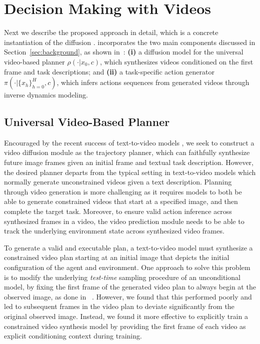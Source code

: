 \section{Decision Making with Videos}\label{sec:method}




Next we describe the proposed approach \model in detail, which is a concrete instantiation of the diffusion \proc. \model incorporates %
the two main components discussed in Section~\ref{sec:background}, %
as shown in~: {\bf (i)} a diffusion model for the universal video-based planner $\rho(\cdot|x_0, c)$, which synthesizes videos conditioned on the first frame and task descriptions; and {\bf (ii)} a task-specific action generator $\pi(\cdot|\{x_h\}_{h=0}^H, c)$, which infers actions sequences from generated videos through inverse dynamics modeling.



\subsection{Universal Video-Based Planner}

Encouraged by the recent success of text-to-video models \citep{ho2022imagen}, we seek to construct a video diffusion module as the trajectory planner, which can faithfully synthesize future image frames given an initial frame and textual task description. 
However, the desired planner departs from the typical setting in text-to-video models \citep{villegas2022phenaki, ho2022imagen} which normally generate unconstrained videos given a text description. Planning through video generation is more challenging as it requires models to both be able to generate constrained videos that start at a specified image, and then complete the target task. 
Moreover, to ensure valid action inference across synthesized frames in a video, the video prediction module needs to be able to track the underlying environment state across synthesized video frames. %

 To generate a valid and executable plan, a text-to-video model must synthesize a constrained video plan starting at an initial image that depicts the initial configuration of the agent and environment. %
One approach to solve this problem is to modify the underlying \emph{test-time} sampling procedure of an unconditional model, by fixing the first frame of the generated video plan to always begin at the observed image, as done in ~\citep{janner2022planning}. However, we found that this performed poorly and led to subsequent frames in the video plan to deviate significantly from the original observed image. Instead, we found it more effective to explicitly train a constrained video synthesis model by providing the first frame of each video as explicit conditioning context during training. 

